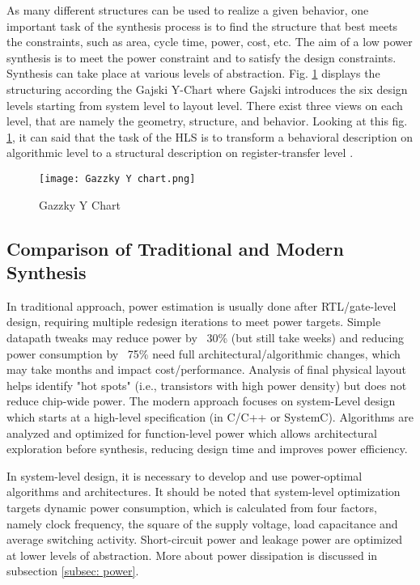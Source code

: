 \documentclass[conference]{IEEEtran}
\begin{document}
As many different structures can be used to realize a given behavior, one important task of the synthesis process is to find the structure that best meets the constraints, such as area, cycle time, power, cost, etc. The aim of a low power synthesis is to meet the power constraint and to satisfy the design constraints. Synthesis can take place at various levels of abstraction. Fig. \ref{fig:gazzky} displays the structuring according the Gajski Y-Chart where Gajski introduces the six design levels starting from system level to layout level. There exist three views on each level, that are namely the geometry, structure, and behavior. Looking at this fig. \ref{fig:gazzky}, it can said that the task of the HLS is to transform a behavioral description on algorithmic level to a structural description on register-transfer level \cite{DDG92}.


\begin{figure}[h!]
    \centering
    \texttt{[image: Gazzky Y chart.png]}
    \caption{Gazzky Y Chart \cite{Ret}}
    \label{fig:gazzky}
\end{figure}

\subsection{Comparison of Traditional and Modern Synthesis}
\label{subsec: comparison of traditional and modern synthesis}
In traditional approach, power estimation is usually done after RTL/gate-level design, requiring multiple redesign iterations to meet power targets. Simple datapath tweaks may reduce power by ~30\% (but still take weeks) and reducing power consumption by ~75\% need full architectural/algorithmic changes, which may take months and impact cost/performance. Analysis of final physical layout helps identify "hot spots" (i.e., transistors with high power density) but does not reduce chip-wide power. The modern approach focuses on system-Level design which starts at a high-level specification (in C/C++ or SystemC). Algorithms are analyzed and optimized for function-level power which allows architectural exploration before synthesis, reducing design time and improves power efficiency.

In system-level design, it is necessary to develop and use power-optimal algorithms and architectures. It should be noted that system-level optimization targets dynamic power consumption, which is calculated from four factors, namely clock frequency, the square of the supply voltage, load capacitance and average switching activity. Short-circuit power and leakage power are optimized at lower levels of abstraction. More about power dissipation is discussed in subsection \ref{subsec: power}.
\end{document}

